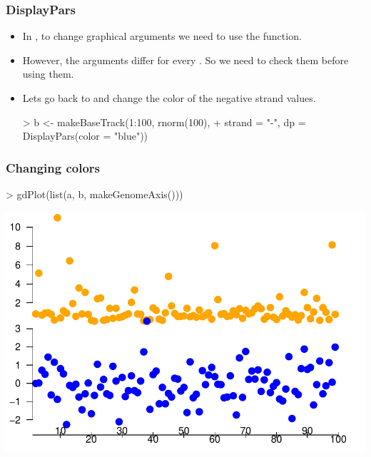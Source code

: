 \begin{frame}
  \frametitle{DisplayPars}
  \begin{itemize}
  \item In , to change graphical arguments we need to use the  function.
  \item However, the arguments differ for every . So we need to check them before using them.
  \item Lets go back to  and change the color of the negative strand values.
\begin{Schunk}
\begin{Sinput}
> b <- makeBaseTrack(1:100, rnorm(100), 
+     strand = "-", dp = DisplayPars(color = "blue"))
\end{Sinput}
\end{Schunk}
  \end{itemize}
\end{frame}

\begin{frame}
  \frametitle{Changing colors}
\begin{Schunk}
\begin{Sinput}
> gdPlot(list(a, b, makeGenomeAxis()))
\end{Sinput}
\end{Schunk}
\includegraphics{plots/fig-014}
\end{frame}

